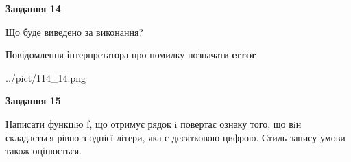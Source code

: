 \documentclass[11pt, ukrainian]{article}
\begin{document}
{\begin {large}
{\begin {center}\textbf{Завдання 14}\end {center}}\par
Що буде виведено за виконання? \par
Повідомлення інтерпретатора про помилку позначати \textbf{error}

\begin{center}
	{../pict/114_14.png}
\end{center}
\newpage

{\begin {center}\textbf{Завдання 15}\end {center}}\par

Написати функцiю f, що отримує рядок i повертає ознаку того, що вiн складається рівно з однієї літери, яка є десятковою цифрою. Стиль запису умови також оцінюється.\par
\newpage

\end {large}}
\end{document}

